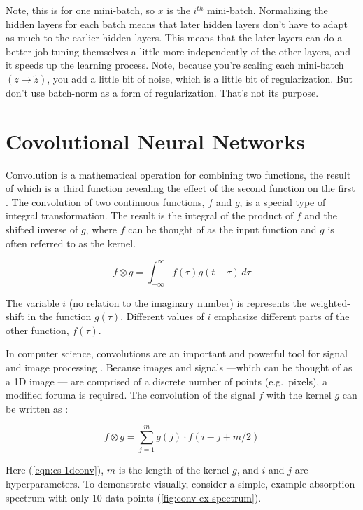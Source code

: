 Note, this is for one mini-batch, so $x$ is the $i^{th}$ mini-batch. Normalizing the hidden layers for each batch means that later hidden layers don't have to adapt as much to the earlier hidden layers. This means that the later layers can do a better job tuning themselves a little more independently of the other layers, and it speeds up the learning process. Note, because you're scaling each mini-batch $(z \rightarrow \widetilde{z})$, you add a little bit of noise, which is a little bit of regularization. But don't use batch-norm as a form of regularization. That's not its purpose.

\section{Covolutional Neural Networks}
Convolution is a mathematical operation for combining two functions, the result of which is a third function revealing the effect of the second function on the first \cite{Boas-mathmethods}. The convolution of two continuous functions, $ f $ and $ g $, is a special type of integral transformation. The result is the integral of the product of $ f $ and the shifted inverse of $ g $, where $ f $ can be thought of as the input function and $ g $ is often referred to as the kernel.

\begin{equation}
    f \otimes g = \int_{-\infty}^{\infty} f(\tau)g(t-\tau) \,d\tau 
\end{equation}

\noindent The variable $ i $ (no relation to the imaginary number) is represents the weighted-shift in the function $ g(\tau) $. Different values of $ i $ emphasize different parts of the other function, $ f(\tau) $.  

In computer science, convolutions are an important and powerful tool for signal and image processing \cite{1dconv-NN-survey} \cite{deepCNNforImages}. Because images and signals ---which can be thought of as a 1D image --- are comprised of a discrete number of points (e.g.~pixels), a modified foruma is required. The convolution of the signal $ f $ with the kernel $ g $ can be written as \cite{cornell-convs}:

\begin{equation}
    \label{eqn:cs-1dconv}
    f \otimes g = \sum_{j=1}^m g(j) \cdot  f(i-j+m/2)
\end{equation}

\noindent Here (\ref{eqn:cs-1dconv}), $ m $ is the length of the kernel $ g $, and $ i $ and $ j $ are hyperparameters. To demonstrate visually, consider a simple, example absorption spectrum with only 10 data points (\ref{fig:conv-ex-spectrum}).


